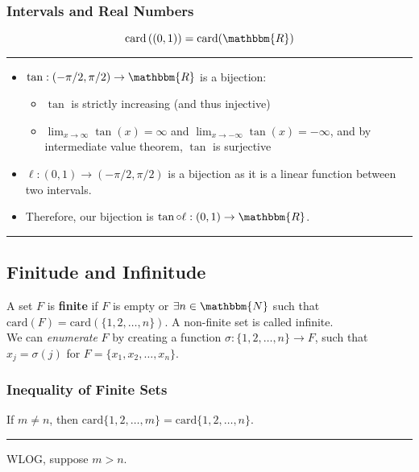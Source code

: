 \documentclass[10pt]{extarticle}
\begin{document}
      \subsubsection{Intervals and Real Numbers}%
      \[
        \text{card}\left((0,1)\right) = \text{card}(\mathbbm{R})
      \] 
      \vspace{4pt}
      \rule{\textwidth}{0.4pt}
      \vspace{4pt}
      \begin{itemize}
        \item $\tan: (-\pi/2,\pi/2) \rightarrow \mathbbm{R}$ is a bijection:
          \begin{itemize}
            \item $\tan$ is strictly increasing (and thus injective)
            \item $\lim_{x\rightarrow\infty} \tan(x) = \infty$ and $\lim_{x\rightarrow -\infty}\tan(x) = -\infty$, and by intermediate value theorem, $\tan$ is surjective
          \end{itemize}
        \item $\ell: (0,1) \rightarrow (-\pi/2,\pi/2)$ is a bijection as it is a linear function between two intervals.
        \item Therefore, our bijection is $\tan \circ \ell: (0,1) \rightarrow \mathbbm{R}$.
      \end{itemize}
      \vspace{4pt}
      \rule{\textwidth}{0.4pt}
    \subsection{Finitude and Infinitude}%
      A set $F$ is \textbf{finite} if $F$ is empty or $\exists n\in \mathbbm{N}$ such that $\text{card}(F) = \text{card}\left(\{1,2,\dots,n\}\right)$. A non-finite set is called infinite.\\

      We can \textsl{enumerate} $F$ by creating a function $\sigma: \{1,2,\dots,n\}\rightarrow F$, such that $x_j = \sigma(j)$ for $F = \{x_1,x_2,\dots,x_n\}$.
      \subsubsection{Inequality of Finite Sets}%
      If $m\neq n$, then $\text{card}\{1,2,\dots,m\} = \text{card}\{1,2,\dots,n\}$.\\
      \vspace{4pt}
      \rule{\textwidth}{0.4pt}
      \vspace{4pt}
      WLOG, suppose $m>n$.\\
\end{document}
